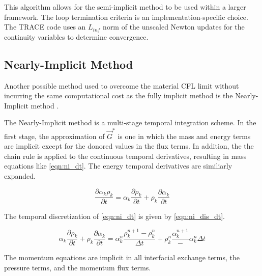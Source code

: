 This algorithm allows for the semi-implicit method to be used within a larger framework.
The loop termination criteria is an implementation-specific choice.
The TRACE code uses an $L_{inf}$ norm of the unscaled Newton updates for the continuity variables to determine convergence.

\subsection{Nearly-Implicit Method}
\label{subsect:numerics_nearly_implicit}
Another possible method used to overcome the material CFL limit without incurring the same computational cost as the fully implicit method is the Nearly-Implicit method \cite{Trapp1986, RELAP}.

The Nearly-Implicit method is a multi-stage temporal integration scheme.
In the first stage, the approximation  of $\vec{G}^{*}$ is one in which the mass and energy terms are implicit except for the donored values in the flux terms. 
In addition, the the chain rule is applied to the continuous temporal derivatives, resulting in mass equations like \eqref{eqn:ni_dt}.
The energy temporal derivatives are similiarly expanded.

\begin{equation}
\label{eqn:ni_dt}
\frac{\partial \alpha_k \rho_k}{\partial t} = \alpha_k \frac{\partial \rho_k}{\partial t} + \rho_k \frac{\partial \alpha_k}{\partial t}
\end{equation}

The temporal discretization of \eqref{eqn:ni_dt} is given by \eqref{eqn:ni_dis_dt}.

\begin{equation}
\label{eqn:ni_dis_dt}
\alpha_k \frac{\partial \rho_k}{\partial t} + \rho_k \frac{\partial \alpha_k}{\partial t} = \alpha^n_k\frac{ \rho^{n+1}_k - \rho^{n}_k}{\Delta t} + \rho^{n}_k\frac{\alpha^{n+1}_k} - \alpha^{n}_k{\Delta t}
\end{equation}

The momentum equations are implicit in all interfacial exchange terms, the pressure terms, and the momentum flux terms.

